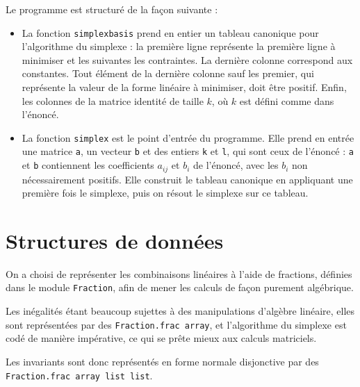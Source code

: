 \documentclass[a4paper]{article}
\begin{document}
Le programme est structuré de la façon suivante :

\begin{itemize}
  \item La fonction \texttt{simplex\textunderscore basis} prend en entier un tableau canonique pour l'algorithme du simplexe : la première ligne représente la première ligne à minimiser et les suivantes les contraintes. La dernière colonne correspond aux constantes. Tout élément de la dernière colonne sauf les premier, qui représente la valeur de la forme linéaire à minimiser, doit être positif. Enfin, les colonnes de la matrice identité de taille $k$, où $k$ est défini comme dans l'énoncé.
  \item La fonction \texttt{simplex} est le point d'entrée du programme. Elle prend en entrée une matrice \texttt{a}, un vecteur \texttt{b} et des entiers \texttt{k} et \texttt{l}, qui sont ceux de l'énoncé : \texttt{a} et \texttt{b} contiennent les coefficients $a_{ij}$ et $b_i$ de l'énoncé, avec les $b_i$ non nécessairement positifs. Elle construit le tableau canonique en appliquant une première fois le simplexe, puis on résout le simplexe sur ce tableau.
\end{itemize}

\section{Structures de données}

On a choisi de représenter les combinaisons linéaires à l'aide de fractions, définies dans le module \texttt{Fraction}, afin de mener les calculs de façon purement algébrique.

Les inégalités étant beaucoup sujettes à des manipulations d'algèbre linéaire, elles sont représentées par des \texttt{Fraction.frac array}, et l'algorithme du simplexe est codé de manière impérative, ce qui se prête mieux aux calculs matriciels.

Les invariants sont donc représentés en forme normale disjonctive par des \texttt{Fraction.frac array list list}.
\end{document}
